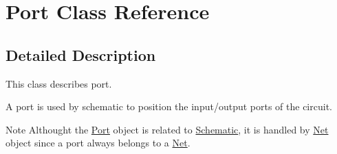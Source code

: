 \hypertarget{class_port}{}\section{Port Class Reference}
\label{class_port}


\subsection{Detailed Description}
This class describes port.

A port is used by schematic to position the input/output ports of the circuit.

\begin{DoxyNote}{Note}
Althought the \mbox{\hyperlink{class_port}{Port}} object is related to \mbox{\hyperlink{class_schematic}{Schematic}}, it is handled by \mbox{\hyperlink{class_net}{Net}} object since a port always belongs to a \mbox{\hyperlink{class_net}{Net}}. 
\end{DoxyNote}
